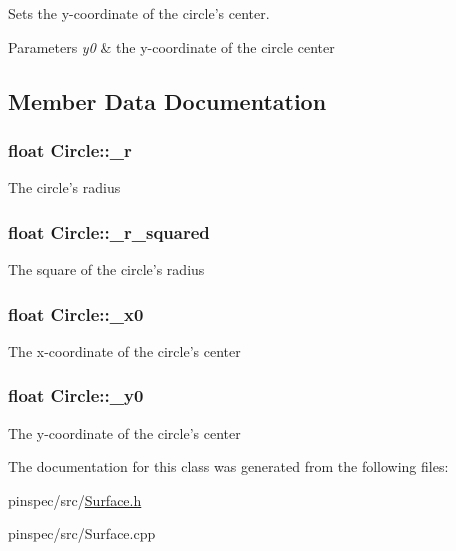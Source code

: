 Sets the y-\/coordinate of the circle's center. 


\begin{DoxyParams}{Parameters}
{\em y0} & the y-\/coordinate of the circle center \\
\hline
\end{DoxyParams}


\subsection{Member Data Documentation}
\hypertarget{classCircle_abe7a680302ea0124535814e97e952fb2}{
\subsubsection[{\-\_\-r}]{\setlength{\rightskip}{0pt plus 5cm}float Circle\-::\-\_\-r\hspace{0.3cm}{\ttfamily [protected]}}}\label{classCircle_abe7a680302ea0124535814e97e952fb2}
The circle's radius \hypertarget{classCircle_a3ecf4a7fff01cf51ee5416041f0695dc}{
\subsubsection[{\-\_\-r\-\_\-squared}]{\setlength{\rightskip}{0pt plus 5cm}float Circle\-::\-\_\-r\-\_\-squared\hspace{0.3cm}{\ttfamily [protected]}}}\label{classCircle_a3ecf4a7fff01cf51ee5416041f0695dc}
The square of the circle's radius \hypertarget{classCircle_a59739a0da9f81d73cf9b4c380f73320f}{
\subsubsection[{\-\_\-x0}]{\setlength{\rightskip}{0pt plus 5cm}float Circle\-::\-\_\-x0\hspace{0.3cm}{\ttfamily [protected]}}}\label{classCircle_a59739a0da9f81d73cf9b4c380f73320f}
The x-\/coordinate of the circle's center \hypertarget{classCircle_af69cb8c32169429fbe856e701ce14ab5}{
\subsubsection[{\-\_\-y0}]{\setlength{\rightskip}{0pt plus 5cm}float Circle\-::\-\_\-y0\hspace{0.3cm}{\ttfamily [protected]}}}\label{classCircle_af69cb8c32169429fbe856e701ce14ab5}
The y-\/coordinate of the circle's center 

The documentation for this class was generated from the following files\-:\begin{DoxyCompactItemize}
\item 
pinspec/src/\hyperlink{Surface_8h}{Surface.\-h}\item 
pinspec/src/Surface.\-cpp\end{DoxyCompactItemize}
